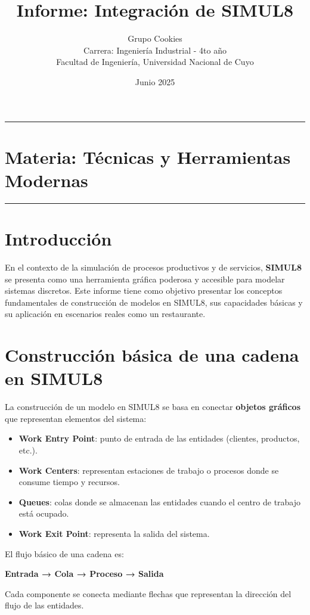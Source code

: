 \documentclass[12pt]{article}
\title{\textbf{Informe: Integración de SIMUL8}}
\author{Grupo Cookies \\
Carrera: Ingeniería Industrial - 4to año \\
Facultad de Ingeniería, Universidad Nacional de Cuyo}
\date{Junio 2025}
\begin{document}
\maketitle
\hrule
\vspace{1em}
\section*{Materia: Técnicas y Herramientas Modernas}
\vspace{1em}
\hrule

\section{Introducción}

En el contexto de la simulación de procesos productivos y de servicios, \textbf{SIMUL8} se presenta como una herramienta gráfica poderosa y accesible para modelar sistemas discretos. Este informe tiene como objetivo presentar los conceptos fundamentales de construcción de modelos en SIMUL8, sus capacidades básicas y su aplicación en escenarios reales como un restaurante.

\section{Construcción básica de una cadena en SIMUL8}

La construcción de un modelo en SIMUL8 se basa en conectar \textbf{objetos gráficos} que representan elementos del sistema:

\begin{itemize}
    \item \textbf{Work Entry Point}: punto de entrada de las entidades (clientes, productos, etc.).
    \item \textbf{Work Centers}: representan estaciones de trabajo o procesos donde se consume tiempo y recursos.
    \item \textbf{Queues}: colas donde se almacenan las entidades cuando el centro de trabajo está ocupado.
    \item \textbf{Work Exit Point}: representa la salida del sistema.
\end{itemize}

El flujo básico de una cadena es:

\textbf{Entrada → Cola → Proceso → Salida}

Cada componente se conecta mediante flechas que representan la dirección del flujo de las entidades.
\end{document}
